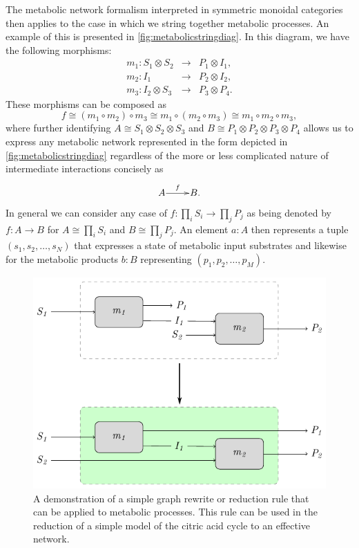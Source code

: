 \documentclass[10pt]{article}
\theoremstyle{plain}
\theoremstyle{definition}
\theoremstyle{remark}
\begin{document}
The metabolic network formalism interpreted in symmetric monoidal categories then applies to the case in which we string together metabolic processes. An example of this is presented in \ref{fig:metabolicstringdiag}. In this diagram, we have the following morphisms:
\begin{eqnarray*}
m_1 \colon S_1 \otimes S_2 &\longrightarrow& P_1 \otimes I_1,\\
m_2 \colon I_1 &\longrightarrow& P_2 \otimes I_2,\\
m_3 \colon I_2 \otimes S_3 &\longrightarrow& P_3 \otimes P_4.
\end{eqnarray*}
These morphisms can be composed as
$$
f \cong (m_1 \circ m_2) \circ m_3 \cong m_1 \circ (m_2 \circ m_3) \cong m_1 \circ m_2 \circ m_3,
$$
where further identifying $A \cong S_1 \otimes S_2 \otimes S_3$ and $B \cong P_1 \otimes P_2 \otimes P_3 \otimes P_4$ allows us to express any metabolic network represented in the form depicted in \ref{fig:metabolicstringdiag} regardless of the more or less complicated nature of intermediate interactions concisely as
$$
\xymatrix@1{
  A\ar[r]^-{f} & B.
  }
$$
In general we can consider any case of $f \colon \prod_i S_i \rightarrow \prod_j P_j$ as being denoted by $f \colon A \rightarrow B$ for $A \cong \prod_i S_i$ and $B \cong \prod_j P_j$. An element $a \colon A$ then represents a tuple $(s_1, s_2, \ldots, s_N)$ that expresses a state of metabolic input substrates and likewise for the metabolic products $b \colon B$ representing $(p_1, p_2, \ldots, p_M)$.

\begin{figure}
\begin{center}
\noindent\includegraphics[width=0.5\columnwidth]{fig/blockassoclaw.pdf}
\end{center}
\caption[Graph rewriting metabolic networks]{A demonstration of a simple graph rewrite or reduction rule that can be applied to metabolic processes. This rule can be used in the reduction of a simple model of the citric acid cycle to an effective network.}
\label{fig:stringassoclaw}
\end{figure}
\end{document}
